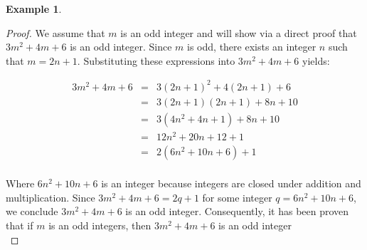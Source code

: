 \documentclass{book}
\theoremstyle{definition}
\newtheorem{example}{Example}[definition]
\theoremstyle{remark}
\begin{document}
\begin{example}
\begin{proof}
    We assume that $m$ is an odd integer and will show via a direct proof that $3m^2 + 4m + 6$ is an odd integer. Since $m$ is odd, there exists an integer $n$ such that $m = 2n + 1$. Substituting these expressions into $3m^2 + 4m + 6$ yields:
    
    \begin{eqnarray*}
        3m^2 + 4m + 6 & = & 3(2n + 1)^2 + 4(2n + 1) + 6 \nonumber \\
        & = & 3(2n + 1)(2n + 1) + 8n + 10 \nonumber \\
        & = & 3(4n^2 + 4n + 1) + 8n + 10 \nonumber \\
        & = & 12n^2 + 20n + 12 + 1 \nonumber \\
        & = & 2(6n^2 + 10n + 6) + 1 \nonumber \\
    \end{eqnarray*}
    
    Where $6n^2 + 10n + 6$ is an integer because integers are closed under addition and multiplication. Since $3m^2 + 4m + 6 = 2q + 1$ for some integer $q = 6n^2 + 10n + 6$, we conclude $3m^2 + 4m + 6$ is an odd integer. Consequently, it has been proven that if $m$ is an odd integers, then $3m^2 + 4m + 6$ is an odd integer \\
\end{proof}
\end{example}
\end{document}
